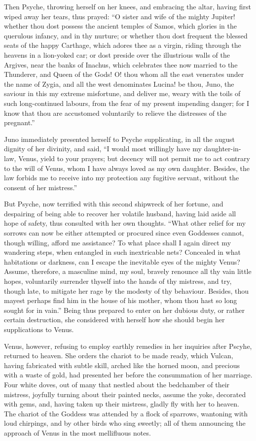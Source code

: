 \documentclass{article}
\begin{document}
Then Psyche, throwing herself on her knees, and embracing the altar, having
first wiped away her tears, thus prayed: ``O sister and wife of the mighty
Jupiter! whether thou dost possess the ancient temples of Samos, which glories
in the querulous infancy, and in thy nurture; or whether thou dost frequent the
blessed seats of the happy Carthage, which adores thee as a virgin, riding
through the heavens in a lion-yoked car; or dost preside over the illustrious
walls of the Argives, near the banks of Inachus, which celebrates thee now
married to the Thunderer, and Queen of the Gods! O! thou whom all the east
venerates under the name of Zygia, and all the west denominates Lucina! be
thou, Juno, the saviour in this my extreme misfortune, and deliver me, weary
with the toils of such long-continued labours, from the fear of my present
impending danger; for I know that thou are accustomed voluntarily to relieve
the distresses of the pregnant.''

Juno immediately presented herself to Psyche supplicating, in all the august
dignity of her divinity, and said, ``I would most willingly have my
daughter-in-law, Venus, yield to your prayers; but decency will not permit me
to act contrary to the will of Venus, whom I have always loved as my own
daughter. Besides, the law forbids me to receive into my protection any
fugitive servant, without the consent of her mistress.''

But Psyche, now terrified with this second shipwreck of her fortune, and
despairing of being able to recover her volatile husband, having laid aside all
hope of safety, thus consulted with her own thoughts. ``What other relief for
my sorrows can now be either attempted or procured since even Goddesses cannot,
though willing, afford me assistance? To what place shall I again direct my
wandering steps, when entangled in such inextricable nets? Concealed in what
habitations or darkness, can I escape the inevitable eyes of the mighty Venus?
Assume, therefore, a masculine mind, my soul, bravely renounce all thy vain
little hopes, voluntarily surrender thyself into the hands of thy mistress, and
try, though late, to mitigate her rage by the modesty of thy behaviour.
Besides, thou mayest perhaps find him in the house of his mother, whom thou
hast so long sought for in vain.'' Being thus prepared to enter on her dubious
duty, or rather certain destruction, she considered with herself how she should
begin her supplications to Venus.

Venus, however, refusing to employ earthly remedies in her inquiries after
Pscyhe, returned to heaven. She orders the chariot to be made ready, which
Vulcan, having fabricated with subtle skill, arched like the horned moon, and
precious with a waste of gold, had presented her before the consummation of her
marriage. Four white doves, out of many that nestled about the bedchamber of
their mistress, joyfully turning about their painted necks, assume the yoke,
decorated with gems, and, having taken up their mistress, gladly fly with her
to heaven. The chariot of the Goddess was attended by a flock of sparrows,
wantoning with loud chirpings, and by other birds who sing sweetly; all of them
announcing the approach of Venus in the most mellifluous notes.
\end{document}
